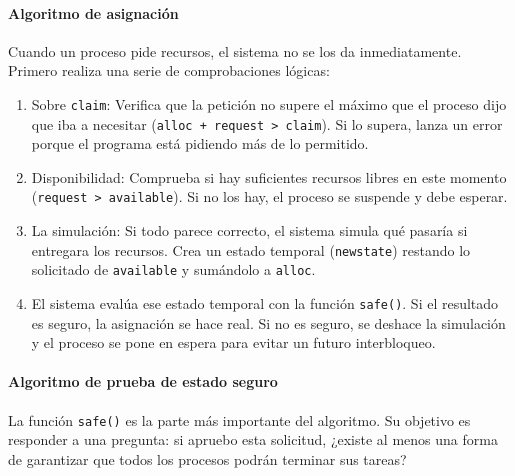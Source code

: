 \paragraph{Algoritmo de asignación}
Cuando un proceso pide recursos, el sistema no se los da inmediatamente. Primero realiza una serie de comprobaciones lógicas:
\begin{enumerate}
  \item Sobre \texttt{claim}: Verifica que la petición no supere el máximo que el proceso dijo que iba a necesitar (\texttt{alloc + request > claim}). Si lo supera, lanza un error porque el programa está pidiendo más de lo permitido.
  \item Disponibilidad: Comprueba si hay suficientes recursos libres en este momento (\texttt{request > available}). Si no los hay, el proceso se suspende y debe esperar.
  \item La simulación: Si todo parece correcto, el sistema simula qué pasaría si entregara los recursos. Crea un estado temporal (\texttt{newstate}) restando lo solicitado de \texttt{available} y sumándolo a \texttt{alloc}.
  \item El sistema evalúa ese estado temporal con la función \texttt{safe()}. Si el resultado es seguro, la asignación se hace real. Si no es seguro, se deshace la simulación y el proceso se pone en espera para evitar un futuro interbloqueo.
\end{enumerate}

\paragraph{Algoritmo de prueba de estado seguro}
La función \texttt{safe()} es la parte más importante del algoritmo. Su objetivo es responder a una pregunta: si apruebo esta solicitud, ¿existe al menos una forma de garantizar que todos los procesos podrán terminar sus tareas?


